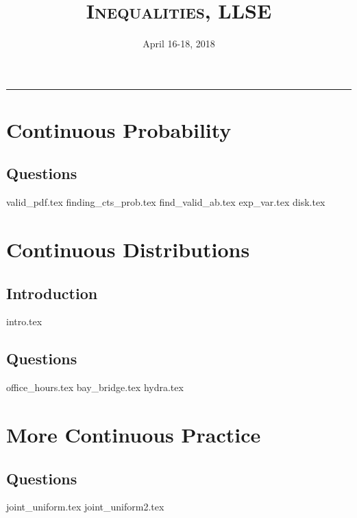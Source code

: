 \documentclass{exam}
\title{\textsc{Inequalities, LLSE}}
\date{April 16-18, 2018}
\begin{document}
\maketitle
\rule{\textwidth}{0.15em}
\fontsize{12}{15}\selectfont
\thispagestyle{empty}


\section{Continuous Probability}

\subsection{Questions}
\begin{questions}
    {valid_pdf.tex}
    {finding_cts_prob.tex} 
    {find_valid_ab.tex}
    {exp_var.tex}
    {disk.tex}
\end{questions}

\section{Continuous Distributions}
\subsection{Introduction}
{intro.tex}
\subsection{Questions}
\begin{questions}
    {office_hours.tex}
    {bay_bridge.tex}
    {hydra.tex}
\end{questions} 

\section{More Continuous Practice}
\subsection{Questions}
\begin{questions}
	{joint_uniform.tex}
	{joint_uniform2.tex}
\end{questions}
\end{document}
